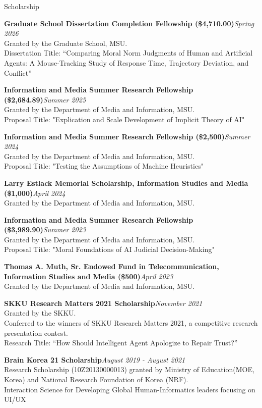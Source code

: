 \documentclass{resume} %
\begin{document}
\begin{rSection}{Scholarship}

{\bf Graduate School Dissertation Completion Fellowship (\$4,710.00)}\hfill {\em Spring 2026}
\\ Granted by the Graduate School, MSU.
\\ Dissertation Title: ``Comparing Moral Norm Judgments of Human and Artificial Agents: A Mouse-Tracking Study of Response Time, Trajectory Deviation, and Conflict''

{\bf Information and Media Summer Research Fellowship (\$2,684.89)}\hfill {\em Summer 2025}
\\ Granted by the Department of Media and Information, MSU.
\\ Proposal Title: "Explication and Scale Development of Implicit Theory of AI"

{\bf Information and Media Summer Research Fellowship (\$2,500)}\hfill {\em Summer 2024}
\\ Granted by the Department of Media and Information, MSU.
\\ Proposal Title: "Testing the Assumptions of Machine Heuristics"

{\bf Larry Estlack Memorial Scholarship, Information Studies and Media (\$1,000)}\hfill {\em April 2024}
\\ Granted by the Department of Media and Information, MSU.

{\bf Information and Media Summer Research Fellowship (\$3,989.90)}\hfill {\em Summer 2023}
\\ Granted by the Department of Media and Information, MSU.
\\ Proposal Title: "Moral Foundations of AI Judicial Decision-Making"

{\bf Thomas A. Muth, Sr. Endowed Fund in Telecommunication, Information Studies and Media (\$500)}\hfill {\em April 2023}
\\ Granted by the Department of Media and Information, MSU.


{\bf SKKU Research Matters 2021 Scholarship}\hfill {\em November 2021}
\\ Granted by the SKKU. \\Conferred to the winners of SKKU Research Matters 2021, a competitive research presentation contest.
\\ Research Title: “How Should Intelligent Agent Apologize to Repair Trust?”


{\bf Brain Korea 21 Scholarship}\hfill {\em August 2019 - August 2021} \\ Research Scholarship (10Z20130000013) granted by Ministry of Education(MOE, Korea) and National Research Foundation of Korea (NRF).\\Interaction Science for Developing Global Human-Informatics leaders focusing on UI/UX


\end{rSection}
\end{document}
